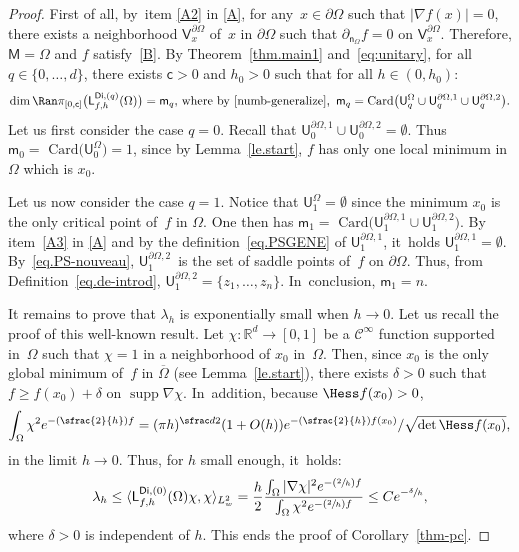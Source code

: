 \documentclass[JEP,XML,SOM,Unicode,NoEqCountersInSection,NoFloatCountersInSection,published]{cedram}
\newcommand{\Psfrac}[2]{(\sfrac{#1}{#2})}
\let\pa\partial
\DeclareMathOperator\supp{supp}
\theoremstyle{plain}
\theoremstyle{definition}
\begin{document}
\begin{proof}
First of all, by~item \eqref{A2} in \ref{A}, for any~$x\in \partial \Omega$ such that $\vert \nabla f(x)\vert =0$, there exists a neighborhood $\mathsf V_x^{\partial \Omega}$ of~$x$ in $\partial \Omega$ such that $ \partial_{\mathsf n_{ \Omega}}f =0 \text{ on } \mathsf V_x^{\partial \Omega}$.
Therefore, $\mathsf M=\Omega$ and $f$ satisfy~\ref{B}.
By Theorem~\ref{thm.main1} and~\eqref{eq:unitary},
for all $q\in \{0,\ldots,d\}$, there exists $\mathsf c>0$ and $h_0>0$ such that for all $h\in (0,h_0)$:
\[
\dim \Ran \pi_{[0,\mathsf c]}\bigl(\mathsf L_{f,h}^{\mathsf{Di},(q)}(\Omega)\bigr)=\mathsf m_q, \,
\text{where by~\eqref{numb-generalize}, }\,
\mathsf m_q=\text{Card}\bigl(\mathsf U_q^{\Omega}\cup \mathsf U^{\partial \Omega,1}_q\cup \mathsf U^{\partial \Omega,2}_q\bigr).
\]
Let us first consider the case $q=0$. Recall that $ \mathsf
U^{\partial \Omega,1}_0\cup \mathsf U^{\partial
\Omega,2}_0=\emptyset$. Thus $\mathsf m_0=\text{ Card}\bigl(\mathsf
U_0^{\Omega})=1$, since by Lemma~\ref{le.start}, $f$ has only one
local minimum in $\Omega$ which is $x_0$.

Let us now consider the case $q=1$. Notice that
$\mathsf U_1^{\Omega}=\emptyset$ since the minimum $x_0$ is the
only
critical point of~$f$ in $\Omega$. One then has
$\mathsf m_1=\text{ Card}\bigl(\mathsf U^{\partial \Omega,1}_1\cup
\mathsf U^{\partial \Omega,2}_1\bigr)$. By item~\eqref{A3} in \ref{A} and
by the definition~\eqref{eq.PSGENE} of $\mathsf U^{\partial \Omega,1}_1$, it~holds $\mathsf U^{\partial \Omega,1}_1=\emptyset$.
By~\eqref{eq.PS-nouveau}, $\mathsf U_1^{\pa \Omega,2}$~is the set
of saddle points of~$f$ on $\partial \Omega$. Thus, from
Definition~\ref{eq.de-introd}, $\mathsf U_1^{\pa
\Omega,2}=\{z_1,\ldots,z_n\}$. In~conclusion, $\mathsf m_1= n$.

It remains to prove that $\lambda_h$ is exponentially small when $h\to
0$. Let us recall the proof of this well-known result. Let $\chi:\mathbb R^d\to [0,1]$ be a $\mathcal C^\infty$ function supported in~$\Omega$ such that $\chi=1$ in a neighborhood of $x_0$ in~$\Omega$. Then, since $x_0$ is the only global minimum of~$f$ in $\overline \Omega$ (see Lemma~\ref{le.start}), there exists $\delta>0$ such that $f\ge f(x_0)+\delta$ on $\supp \nabla \chi$. In~addition, because $\Hess f(x_0)>0$,
\[
\int_{\Omega} \chi^2 e^{-\Psfrac 2h f}  = (\pi h)^{\sfrac d2} (1+O(h))e^{-\Psfrac 2h f(x_0)} /\sqrt{\det \Hess f(x_0)},
\]
in the limit $h\to 0$. Thus, for $h$ small enough, it~holds:\vspace*{-3pt}
\[
\lambda_h\le \langle \mathsf L_{f,h}^{\mathsf{Di}, (0)}(\Omega)\chi, \chi\rangle_{L^2_w}= \frac h2 \frac {\int_{\Omega} |\nabla \chi|^2 e^{-\Psfrac 2h f} }{\int_{\Omega} \chi^2 e^{-\Psfrac 2h f}}  \le Ce^{-\sfrac \delta h},
\]
where $\delta>0$ is independent of $h$.
This ends the proof of Corollary~\ref{thm-pc}.
\end{proof}
\end{document}
